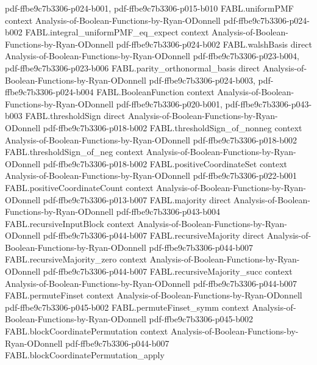 \begin{theorem}
  {pdf-ffbe9c7b3306-p024-b001,
    pdf-ffbe9c7b3306-p015-b010}
\proofstep
  {FABL.uniformPMF}
  {context}
  {Analysis-of-Boolean-Functions-by-Ryan-ODonnell}
  {pdf-ffbe9c7b3306-p024-b002}
\proofstep
  {FABL.integral_uniformPMF_eq_expect}
  {context}
  {Analysis-of-Boolean-Functions-by-Ryan-ODonnell}
  {pdf-ffbe9c7b3306-p024-b002}
\proofstep
  {FABL.walshBasis}
  {direct}
  {Analysis-of-Boolean-Functions-by-Ryan-ODonnell}
  {pdf-ffbe9c7b3306-p023-b004,
    pdf-ffbe9c7b3306-p023-b006}
\proofstep
  {FABL.parity_orthonormal_basis}
  {direct}
  {Analysis-of-Boolean-Functions-by-Ryan-ODonnell}
  {pdf-ffbe9c7b3306-p024-b003,
    pdf-ffbe9c7b3306-p024-b004}
\proofstep
  {FABL.BooleanFunction}
  {context}
  {Analysis-of-Boolean-Functions-by-Ryan-ODonnell}
  {pdf-ffbe9c7b3306-p020-b001,
    pdf-ffbe9c7b3306-p043-b003}
\proofstep
  {FABL.thresholdSign}
  {direct}
  {Analysis-of-Boolean-Functions-by-Ryan-ODonnell}
  {pdf-ffbe9c7b3306-p018-b002}
\proofstep
  {FABL.thresholdSign_of_nonneg}
  {context}
  {Analysis-of-Boolean-Functions-by-Ryan-ODonnell}
  {pdf-ffbe9c7b3306-p018-b002}
\proofstep
  {FABL.thresholdSign_of_neg}
  {context}
  {Analysis-of-Boolean-Functions-by-Ryan-ODonnell}
  {pdf-ffbe9c7b3306-p018-b002}
\proofstep
  {FABL.positiveCoordinateSet}
  {context}
  {Analysis-of-Boolean-Functions-by-Ryan-ODonnell}
  {pdf-ffbe9c7b3306-p022-b001}
\proofstep
  {FABL.positiveCoordinateCount}
  {context}
  {Analysis-of-Boolean-Functions-by-Ryan-ODonnell}
  {pdf-ffbe9c7b3306-p013-b007}
\proofstep
  {FABL.majority}
  {direct}
  {Analysis-of-Boolean-Functions-by-Ryan-ODonnell}
  {pdf-ffbe9c7b3306-p043-b004}
\proofstep
  {FABL.recursiveInputBlock}
  {context}
  {Analysis-of-Boolean-Functions-by-Ryan-ODonnell}
  {pdf-ffbe9c7b3306-p044-b007}
\proofstep
  {FABL.recursiveMajority}
  {direct}
  {Analysis-of-Boolean-Functions-by-Ryan-ODonnell}
  {pdf-ffbe9c7b3306-p044-b007}
\proofstep
  {FABL.recursiveMajority_zero}
  {context}
  {Analysis-of-Boolean-Functions-by-Ryan-ODonnell}
  {pdf-ffbe9c7b3306-p044-b007}
\proofstep
  {FABL.recursiveMajority_succ}
  {context}
  {Analysis-of-Boolean-Functions-by-Ryan-ODonnell}
  {pdf-ffbe9c7b3306-p044-b007}
\proofstep
  {FABL.permuteFinset}
  {context}
  {Analysis-of-Boolean-Functions-by-Ryan-ODonnell}
  {pdf-ffbe9c7b3306-p045-b002}
\proofstep
  {FABL.permuteFinset_symm}
  {context}
  {Analysis-of-Boolean-Functions-by-Ryan-ODonnell}
  {pdf-ffbe9c7b3306-p045-b002}
\proofstep
  {FABL.blockCoordinatePermutation}
  {context}
  {Analysis-of-Boolean-Functions-by-Ryan-ODonnell}
  {pdf-ffbe9c7b3306-p044-b007}
\proofstep
  {FABL.blockCoordinatePermutation_apply}

\end{theorem}
